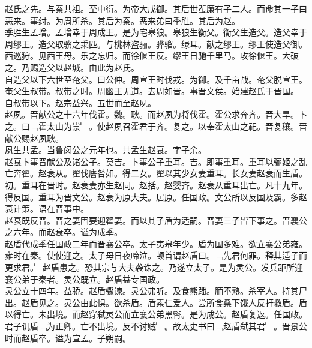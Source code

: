 \documentclass{zhvt-classic}
\begin{document}

\hspace*{2em}赵氏之先。与秦共祖。至中衍。为帝大戊御。其后世蜚廉有子二人。而命其一子曰恶来。事纣。为周所杀。其后为秦。恶来弟曰季胜。其后为赵。\\
\hspace*{2em}季胜生孟增。孟增幸于周成王。是为宅皋狼。皋狼生衡父。衡父生造父。造父幸于周缪王。造父取骥之乘匹。与桃林盗骊。骅骝。绿耳。献之缪王。缪王使造父御。西巡狩。见西王母。乐之忘归。而徐偃王反。缪王日驰千里马。攻徐偃王。大破之。乃赐造父以赵城。由此为赵氏。\\
\hspace*{2em}自造父以下六世至奄父。曰公仲。周宣王时伐戎。为御。及千亩战。奄父脱宣王。奄父生叔带。叔带之时。周幽王无道。去周如晋。事晋文侯。始建赵氏于晋国。\\
\hspace*{2em}自叔带以下。赵宗益兴。五世而至赵夙。\\
\hspace*{2em}赵夙。晋献公之十六年伐霍。魏。耿。而赵夙为将伐霍。霍公求奔齐。晋大旱。卜之。曰﹁霍太山为祟﹂。使赵夙召霍君于齐。复之。以奉霍太山之祀。晋复穰。晋献公赐赵夙耿。\\
\hspace*{2em}夙生共孟。当鲁闵公之元年也。共孟生赵衰。字子余。\\
\hspace*{2em}赵衰卜事晋献公及诸公子。莫吉。卜事公子重耳。吉。即事重耳。重耳以骊姬之乱亡奔翟。赵衰从。翟伐廧咎如。得二女。翟以其少女妻重耳。长女妻赵衰而生盾。\\
\hspace*{2em}初。重耳在晋时。赵衰妻亦生赵同。赵括。赵婴齐。赵衰从重耳出亡。凡十九年。得反国。重耳为晋文公。赵衰为原大夫。居原。任国政。文公所以反国及霸。多赵衰计策。语在晋事中。\\
\hspace*{2em}赵衰既反晋。晋之妻固要迎翟妻。而以其子盾为适嗣。晋妻三子皆下事之。晋襄公之六年。而赵衰卒。谥为成季。\\
\hspace*{2em}赵盾代成季任国政二年而晋襄公卒。太子夷皋年少。盾为国多难。欲立襄公弟雍。雍时在秦。使使迎之。太子母日夜啼泣。顿首谓赵盾曰。﹁先君何罪。释其适子而更求君。﹂赵盾患之。恐其宗与大夫袭诛之。乃遂立太子。是为灵公。发兵距所迎襄公弟于秦者。灵公既立。赵盾益专国政。\\
\hspace*{2em}灵公立十四年。益骄。赵盾骤谏。灵公弗听。及食熊蹯。胹不熟。杀宰人。持其尸出。赵盾见之。灵公由此惧。欲杀盾。盾素仁爱人。尝所食桑下饿人反扞救盾。盾以得亡。未出境。而赵穿弑灵公而立襄公弟黑臀。是为成公。赵盾复返。任国政。君子讥盾﹁为正卿。亡不出境。反不讨贼﹂。故太史书曰﹁赵盾弑其君﹂。晋景公时而赵盾卒。谥为宣孟。子朔嗣。\\
\end{document}
